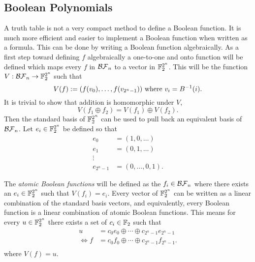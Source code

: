 \subsection{Boolean Polynomials}
\par A truth table is not a very compact method to define a Boolean
function. It is much more efficient and easier to implement a Boolean
function when written as a formula. This can be done by writing a Boolean
function algebraically. As a first step toward defining $f$ algebraically a
one-to-one and onto function will be defined which maps every $f$ in
$\mathcal{BF}_n$ to a vector in $\mathbb{F}_2^{2^n}$. This will be the function
$V:\mathcal{BF}_n\rightarrow\mathbb{F}_2^{2^n}$ such that
\begin{equation}\label{eqn:bool-vector}
	V(f)
    :=(f(v_0),\dots,f(v_{2^n-1}))\ {\rm where\ } v_i=B^{-1}(i).
\end{equation}
It is trivial to show that addition is homomorphic under $V$,
\[
V(f_1\oplus f_2)=V(f_1)\oplus V(f_2).
\]
Then the standard basis of $\mathbb{F}_2^{2^n}$ can be used to pull back an
equivalent basis of $\mathcal{BF}_n$. Let $e_i\in\mathbb{F}_2^{2^n}$ be defined so that
\begin{align*}
	e_0&=(1,0,\dots)\\
	e_1&=(0,1,\dots)\\
	\vdots \\
	e_{2^n-1}&=(0,\dots,0,1).
\end{align*}
\par The {\em atomic Boolean functions} will be defined as the
$f_i\in\mathcal{BF}_n$ where there exists an $e_i\in\mathbb{F}_2^{2^n}$ such that
$V(f_i)=e_i$. Every vector of $\mathbb{F}_2^{2^n}$ can be written as a linear
combination of the standard basis vectors, and equivalently, every Boolean
function is a linear combination of atomic Boolean functions. This means
for every $u\in\mathbb{F}_2^{2^n}$ there exists a set of $c_i\in\mathbb{F}_2$ such that
\begin{align*}
	u  &=c_0e_0\oplus\cdots\oplus c_{2^n-1}e_{2^n-1} \\
	\Leftrightarrow f &=c_0f_0\oplus\cdots\oplus c_{2^n-1}f_{2^n-1}.\\
\end{align*}
where $V(f)=u$.

